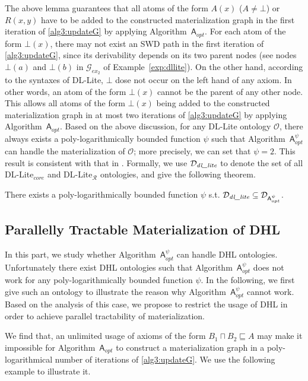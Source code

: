 \documentclass[final,1p,times]{elsarticle}
\begin{document}
The above lemma guarantees that all atoms of the form $A(x)$ ($A\neq\bot$) or $R(x,y)$
have to be added to the constructed materialization graph in the first iteration of
\ref{alg3:updateG} by applying Algorithm~$\mathsf{A}_{opt}$.
For each atom of the form $\bot(x)$, there may not exist an SWD path in the first iteration
of \ref{alg3:updateG}, since its derivability depends on its two parent nodes
(see nodes $\bot(a)$ and $\bot(b)$ in $\mathcal{G}_{ex_2}$ of
Example~\ref{exp:dllite}). On the other hand, according to the syntaxes of DL-Lite,
$\bot$ dose not occur on the left hand of any axiom. In other words,
an atom of the form $\bot(x)$ cannot be the parent of any other node.
This allows all atoms of the form $\bot(x)$ being added
to the constructed materialization graph in at most two iterations of
\ref{alg3:updateG} by applying Algorithm~$\mathsf{A}_{opt}$.
Based on the above discussion, for any DL-Lite ontology $\mathcal{O}$,
there always exists a poly-logarithmically bounded function $\psi$ such that
Algorithm~$\mathsf{A}_{opt}^{\psi}$ can handle the materialization of $\mathcal{O}$;
more precisely, we can set that $\psi=2$. This result is consistent with
that in \cite{CalvaneseGLLR07}.
Formally, we use $\mathcal{D}_{\textit{\text{dl\_lite}}}$
to denote the set of all DL-Lite$_{core}$ and DL-Lite$_\mathcal{R}$ ontologies, and give the following theorem.

\begin{theorem}\label{theorem:dl-lite}
There exists a poly-logarithmically bounded function $\psi$ s.t.
$\mathcal{D}_{\textit{\text{dl\_lite}}}\subseteq\mathcal{D}_{\mathsf{A}_{opt}^{\psi}}$.
\end{theorem}

\subsection{Parallelly Tractable Materialization of DHL}

In this part, we study whether Algorithm~$\mathsf{A}_{opt}^\psi$ can handle DHL ontologies.
Unfortunately there exist DHL ontologies such that Algorithm~$\mathsf{A}_{opt}^\psi$
does not work for any poly-logarithmically bounded function $\psi$.
In the following, we first give such an ontology
to illustrate the reason why Algorithm~$\mathsf{A}_{opt}^\psi$ cannot work.
Based on the analysis of this case, we propose to restrict
the usage of DHL in order to achieve parallel tractability
of materialization.

We find that, an unlimited usage of axioms of the
form $B_1\sqcap B_2\sqsubseteq A$
may make it impossible for Algorithm~$\mathsf{A}_{opt}$ to construct a materialization graph
in a poly-logarithmical number of iterations of \ref{alg3:updateG}.
We use the following example to illustrate it.
\end{document}
